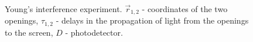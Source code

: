 \begin{figure}
\centering



\caption{Young's interference experiment. $\vec{r}_{1,2}$ - coordinates
  of the two openings, $\tau_{1,2}$ - delays in the propagation of light
  from the openings to the screen, $D$ - photodetector.}
\label{figPart4Ch2_2}
\end{figure}